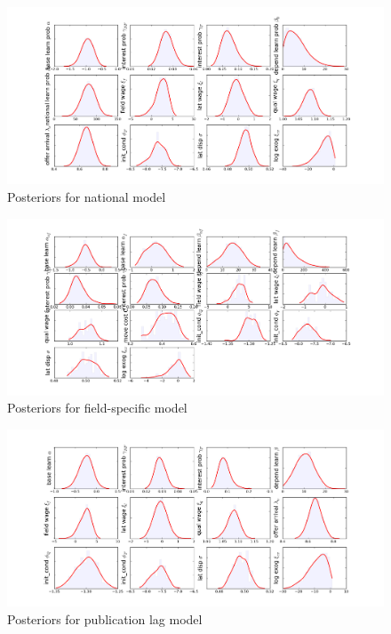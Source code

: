 \begin{figure}[!ht]
    \includegraphics[scale=0.35]{pics/params_dists_reg.png}
    \caption{Posteriors for national model}
\end{figure}

\begin{figure}[!ht]
    \includegraphics[scale=0.35]{pics/params_dists_split.png}
    \caption{Posteriors for field-specific model}
\end{figure}

\begin{figure}[!ht]
    \includegraphics[scale=0.35]{pics/params_dists_lag.png}
    \caption{Posteriors for publication lag model}
\end{figure}

